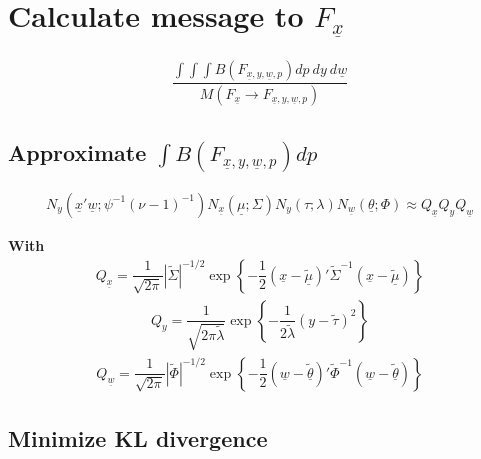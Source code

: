 \documentclass[fleqn]{minimal}
\begin{document}
\section{Calculate message to $F_{\underline{x}}$}

\begin{align*}
  \dfrac{\int \int \int B\left(F_{\underline{x}, y, \underline{w}, p}\right) dp \ dy \ d\underline{w}}
  {
    M\left(
      F_{\underline{x}} \rightarrow
      F_{\underline{x}, y, \underline{w}, p}
    \right)
  }
\end{align*}

\subsection{Approximate $\int B\left(F_{\underline{x}, y, \underline{w}, p}\right) dp$}

\begin{align*}
  N_y\left(\underline{x}'\underline{w} ; \psi^{-1}\left(\nu-1\right)^{-1}\right)
  N_{\underline{x}} \left( \underline{\mu} ; \Sigma\right)
  N_{y} \left( \tau ; \lambda\right)
  N_{\underline{w}} \left( \underline{\theta} ; \Phi\right)
  \approx
  Q_{\underline{x}} Q_{y} Q_{\underline{w}}
\end{align*}

\textbf{With}
\begin{align*}
  Q_{\underline{x}} =
  \dfrac{1}{\sqrt{2\pi}}
  \left| \tilde{\Sigma} \right|^{-1/2}
  \exp
  \left\{
    - \dfrac{1}{2}
    \left( \underline{x} - \underline{\tilde{\mu}}\right)'
    \tilde{\Sigma}^{-1}
    \left( \underline{x} - \underline{\tilde{\mu}}\right)
  \right\}
\end{align*}
\begin{align*}
  Q_y =
  \dfrac{1}{\sqrt{2\pi\tilde{\lambda}}}
  \exp
  \left\{
    - \dfrac{1}{2\tilde{\lambda}}
    \left(y - \tilde{\tau}\right)^2
  \right\}
\end{align*}
\begin{align*}
  Q_{\underline{w}} =
  \dfrac{1}{\sqrt{2\pi}}
  \left| \tilde{\Phi} \right|^{-1/2}
  \exp
  \left\{
    - \dfrac{1}{2}
    \left( \underline{w} - \underline{\tilde{\theta}}\right)'
    \tilde{\Phi}^{-1}
    \left( \underline{w} - \underline{\tilde{\theta}}\right)
  \right\}
\end{align*}

\subsection{Minimize KL divergence}
\end{document}
